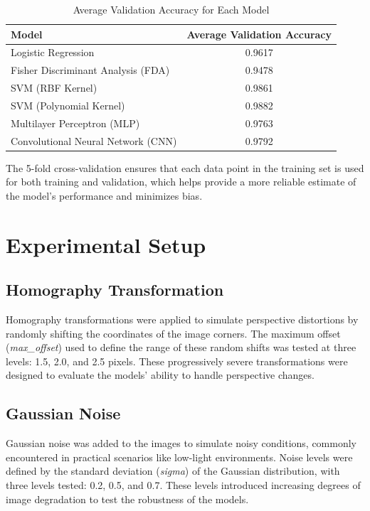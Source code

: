 \documentclass{article}
\begin{document}
\begin{table}[h]
    \centering
    \caption{Average Validation Accuracy for Each Model}
    \label{tab:validation_accuracy}
    \begin{tabular}{l c}
        \toprule
        \textbf{Model} & \textbf{Average Validation Accuracy} \\
        \midrule
        Logistic Regression & 0.9617 \\
        Fisher Discriminant Analysis (FDA) & 0.9478 \\
        SVM (RBF Kernel) & 0.9861 \\
        SVM (Polynomial Kernel) & 0.9882 \\
        Multilayer Perceptron (MLP) & 0.9763 \\
        Convolutional Neural Network (CNN) & 0.9792 \\
        \bottomrule
    \end{tabular}
\end{table}

The 5-fold cross-validation ensures that each data point in the training set is used for both training and validation, which helps provide a more reliable estimate of the model's performance and minimizes bias.

\section{Experimental Setup}

\subsection{Homography Transformation}
Homography transformations were applied to simulate perspective distortions by randomly shifting the coordinates of the image corners. The maximum offset (\textit{max\_offset}) used to define the range of these random shifts was tested at three levels: 1.5, 2.0, and 2.5 pixels. These progressively severe transformations were designed to evaluate the models' ability to handle perspective changes.

\subsection{Gaussian Noise}
Gaussian noise was added to the images to simulate noisy conditions, commonly encountered in practical scenarios like low-light environments. Noise levels were defined by the standard deviation (\textit{sigma}) of the Gaussian distribution, with three levels tested: 0.2, 0.5, and 0.7. These levels introduced increasing degrees of image degradation to test the robustness of the models.
\end{document}
